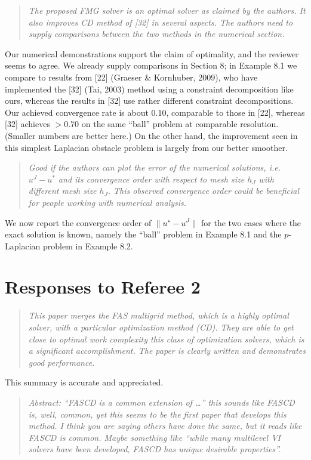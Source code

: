 \documentclass[letterpaper,final,12pt,reqno]{amsart}
\newenvironment{review}%
{\bigskip \par \begin{quote} \selectfont \sl}%
{\end{quote}}
\newcommand\short[1]{\medskip\noindent #1}   %
\begin{document}
\begin{review}
The proposed FMG solver is an optimal solver as claimed by the authors. It also improves CD method of [32] in several aspects. The authors need to supply comparisons between the two methods in the numerical section.
\end{review}

\short{Our numerical demonstrations support the claim of optimality, and the reviewer seems to agree.  We already supply comparisons in Section 8; in Example 8.1 we compare to results from [22] (Graeser \& Kornhuber, 2009), who have implemented the [32] (Tai, 2003) method using a constraint decomposition like ours, whereas the results in [32] use rather different constraint decompositions.  Our achieved convergence rate is about $0.10$, comparable to those in [22], whereas [32] achieves $>0.70$ on the same ``ball'' problem at comparable resolution.  (Smaller numbers are better here.)  On the other hand, the improvement seen in this simplest Laplacian obstacle problem is largely from our better smoother.}

\begin{review}
Good if the authors can plot the error of the numerical solutions, i.e. $u^J - u^*$ and its convergence order with respect to mesh size $h_J$ with different mesh size $h_J$. This observed convergence order could be beneficial for people working with numerical analysis.
\end{review}

\short{We now report the convergence order of $\|u^\star - u^J\|$ for the two cases where the exact solution is known, namely the ``ball'' problem in Example 8.1 and the $p$-Laplacian problem in Example 8.2.}


\section{Responses to Referee 2}

\begin{review}
This paper merges the FAS multigrid method, which is a highly optimal solver, with a particular optimization method (CD).  They are able to get close to optimal work complexity this class of optimization solvers, which is a significant accomplishment.  The paper is clearly written and demonstrates good performance.
\end{review}

\short{This summary is accurate and appreciated.}

\begin{review}
Abstract: ``FASCD is a common extension of \dots'' this sounds like FASCD is, well, common, yet this seems to be the first paper that develops this method.  I think you are saying others have done the same, but it reads like FASCD is common.  Maybe something like ``while many multilevel VI solvers have been developed, FASCD has unique desirable properties''.
\end{review}
\end{document}
